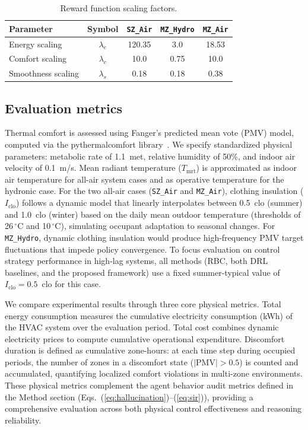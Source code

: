 \documentclass[a4paper]{cas-sc}
\begin{document}
\begin{table}[htbp]
    \centering
    \caption{Reward function scaling factors.}
    \label{tab:scaling}
    \renewcommand{\arraystretch}{1.3}
    \begin{tabular}{l c c c c}
        \toprule
        \textbf{Parameter} & \textbf{Symbol} & \texttt{SZ\_Air} & \texttt{MZ\_Hydro} & \texttt{MZ\_Air} \\
        \midrule
        Energy scaling   & $\lambda_e$ & 120.35 & 3.0  & 18.53 \\
        Comfort scaling  & $\lambda_c$ & 10.0   & 0.75 & 10.0 \\
        Smoothness scaling & $\lambda_s$ & 0.18 & 0.18 & 0.38 \\
        \bottomrule
    \end{tabular}
\end{table}

\subsection{Evaluation metrics}

Thermal comfort is assessed using Fanger's predicted mean vote (PMV) model, computed via the pythermalcomfort library~\cite{Tartarini2020-ox}. We specify standardized physical parameters: metabolic rate of 1.1~met, relative humidity of 50\%, and indoor air velocity of 0.1~m/s. Mean radiant temperature ($T_{\text{mrt}}$) is approximated as indoor air temperature for all-air system cases and as operative temperature for the hydronic case. For the two all-air cases (\texttt{SZ\_Air} and \texttt{MZ\_Air}), clothing insulation ($I_{\text{clo}}$) follows a dynamic model that linearly interpolates between 0.5~clo (summer) and 1.0~clo (winter) based on the daily mean outdoor temperature (thresholds of 26\,$^{\circ}$C and 10\,$^{\circ}$C), simulating occupant adaptation to seasonal changes. For \texttt{MZ\_Hydro}, dynamic clothing insulation would produce high-frequency PMV target fluctuations that impede policy convergence. To focus evaluation on control strategy performance in high-lag systems, all methods (RBC, both DRL baselines, and the proposed framework) use a fixed summer-typical value of $I_{\text{clo}} = 0.5$~clo for this case.

We compare experimental results through three core physical metrics. Total energy consumption measures the cumulative electricity consumption (kWh) of the HVAC system over the evaluation period. Total cost combines dynamic electricity prices to compute cumulative operational expenditure. Discomfort duration is defined as cumulative zone-hours: at each time step during occupied periods, the number of zones in a discomfort state ($|\text{PMV}| > 0.5$) is counted and accumulated, quantifying localized comfort violations in multi-zone environments. These physical metrics complement the agent behavior audit metrics defined in the Method section (Eqs.~(\ref{eq:hallucination})--(\ref{eq:sir})), providing a comprehensive evaluation across both physical control effectiveness and reasoning reliability.
\end{document}
